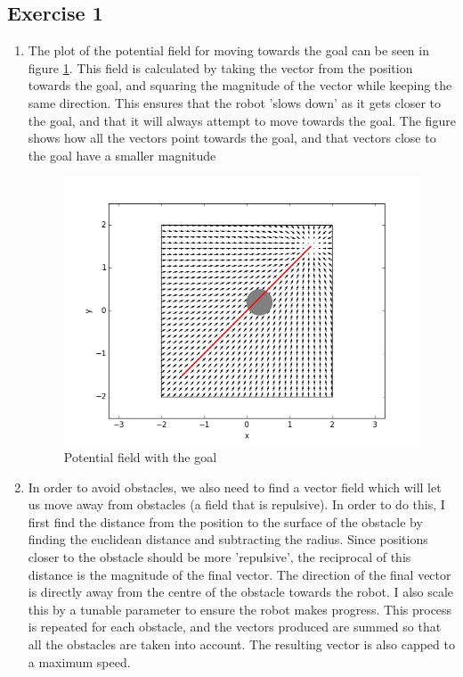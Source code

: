 \documentclass[12pt,a4paper]{article}
\begin{document}
\subsection*{Exercise 1}
\begin{enumerate}[label=(\alph*)]
	\item The plot of the potential field for moving towards the goal can be seen in figure \ref{fig:goal_mode}. This field is calculated by taking the vector from the position towards the goal, and squaring the magnitude of the vector while keeping the same direction. This ensures that the robot 'slows down' as it gets closer to the goal, and that it will always attempt to move towards the goal. The figure shows how all the vectors point towards the goal, and that vectors close to the goal have a smaller magnitude
	\begin{figure}[!h]
		\centering
		\includegraphics[width=\textwidth]{fig/1a.png}
		\caption{Potential field with the goal}
		\label{fig:goal_mode}
	\end{figure}
	\item In order to avoid obstacles, we also need to find a vector field which will let us move away from obstacles (a field that is repulsive). In order to do this, I first find the distance from the position to the surface of the  obstacle by finding the euclidean distance and subtracting the radius. Since positions closer to the obstacle should be more 'repulsive', the reciprocal of this distance is the magnitude of the final vector. The direction of the final vector is directly away from the centre of the obstacle towards the robot. I also scale this by a tunable parameter to ensure the robot makes progress. This process is repeated for each obstacle, and the vectors produced are summed so that all the obstacles are taken into account. The resulting vector is also capped to a maximum speed.

\end{enumerate}
\end{document}
